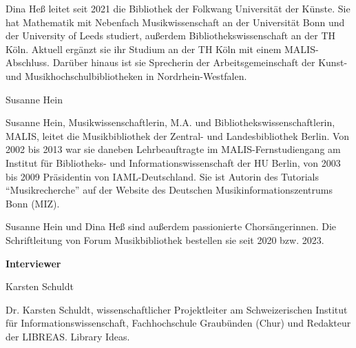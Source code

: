 \documentclass[a4paper,
fontsize=11pt,
oneside,
numbers=noperiodatend,
parskip=half-,
bibliography=totoc,
final
]{scrartcl}
\begin{document}
Dina Heß leitet seit 2021 die Bibliothek der Folkwang Universität der Künste. 
Sie hat Mathematik mit Nebenfach Musikwissenschaft an der Universität Bonn und 
der University of Leeds studiert, außerdem Bibliothekswissenschaft an der TH Köln. 
Aktuell ergänzt sie ihr Studium an der TH Köln mit einem MALIS-Abschluss. Darüber 
hinaus ist sie Sprecherin der Arbeitsgemeinschaft der Kunst- und Musikhochschulbibliotheken 
in Nordrhein-Westfalen.

Susanne Hein

Susanne Hein, Musikwissenschaftlerin, M.A. und Bibliothekswissenschaftlerin, MALIS, 
leitet die Musikbibliothek der Zentral- und Landesbibliothek Berlin. Von 2002 bis 2013 
war sie daneben Lehrbeauftragte im MALIS-Fernstudiengang am Institut für Bibliotheks- und Informationswissenschaft
der HU Berlin, von 2003 bis 2009 Präsidentin von IAML-Deutschland. Sie ist Autorin des Tutorials 
\enquote{Musikrecherche} auf der Website des Deutschen Musikinformationszentrums Bonn (MIZ).

Susanne Hein und Dina Heß sind außerdem passionierte Chorsängerinnen. Die Schriftleitung von Forum 
Musikbibliothek bestellen sie seit 2020 bzw. 2023.

\textbf{Interviewer}

Karsten Schuldt
 
Dr. Karsten Schuldt, wissenschaftlicher Projektleiter am Schweizerischen Institut für Informationswissenschaft,
Fachhochschule Graubünden (Chur) und Redakteur der LIBREAS. Library Ideas.
\end{document}
